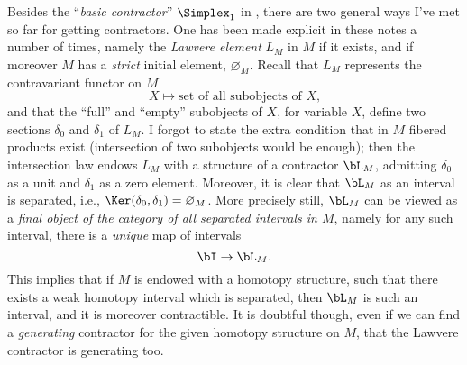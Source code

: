 Besides the ``\emph{basic contractor}'' $\Simplex_1$ in \Cat, there are
two general ways I've met so far for getting contractors. One has been
made explicit in these notes a number of times, namely the
\emph{Lawvere element} $L_M$ in $M$ if it exists, and if
moreover $M$ has a \emph{strict} initial element,
$\varnothing_M$. Recall that $L_M$ represents the contravariant functor
on $M$
\[X\mapsto\text{set of all subobjects of $X$,}\]
and that the ``full'' and ``empty'' subobjects of $X$, for variable
$X$, define two sections $\delta_0$ and $\delta_1$ of $L_M$. I forgot
to state the extra condition that in $M$ fibered products exist
(intersection of two subobjects would be enough); then the
intersection law endows $L_M$ with a structure of a contractor
$\bL_M$, admitting $\delta_0$ as a unit and $\delta_1$ as a zero
element. Moreover, it is clear that $\bL_M$ as an interval is
separated, i.e., $\Ker(\delta_0,\delta_1)=\varnothing_M$. More precisely
still, $\bL_M$ can be viewed as a \emph{final object of the category
  of all separated intervals in $M$}, namely for any such interval,
there is a \emph{unique} map of intervals
\[\bI\to\bL_M.\]
This implies that if $M$ is endowed with a homotopy structure, such
that there exists a weak homotopy interval which is separated, then
$\bL_M$ is such an interval, and it is moreover contractible. It is
doubtful though, even if we can find a \emph{generating} contractor
for the given homotopy structure on $M$, that the Lawvere contractor
is generating too.

